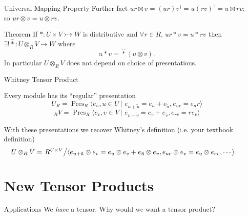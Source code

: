 \documentclass{beamer}
\renewcommand{\hat}[1]{\widehat{#1}}
\DeclareMathOperator{\Pres}{Pres}
\newcommand{\bmto}{\rightarrowtail}
\begin{document}
\begin{frame}{Universal Mapping Property}
    Further fact $ur\boxtimes v=(ur)v^{\dagger}=u(rv)^{\dagger}=u\boxtimes rv$;\\
    so $ur\otimes v=u\otimes r v$.
    
    \begin{block}{Theorem}
        If $*:U\times V\bmto W$ is distributive and $\forall r\in R$, $ur*v=u*rv$ then $\exists ! \hat{*}:U\otimes_R V\to W$ where 
        \[
            u*v = \hat{*}(u\otimes v).
        \]
        In particular $U\otimes_R V$ does not depend on choice of presentations.
    \end{block}

    
\end{frame}

\begin{frame}{Whitney Tensor Product}

    Every module has its ``regular'' presentation
    \[ U_R=\Pres_R\langle e_u, u\in U \mid e_{u+\tilde{u}}=e_u+e_{\tilde{u}}, e_{ur}=e_u r\rangle
        \]
    \[ {_R V}=\Pres_R\langle e_v, v\in V\mid e_{v+\tilde{v}}=e_v+e_{\tilde{v}}, e_{rv}=re_v\rangle
        \]

    With these presentations we recover Whitney's definition (i.e. your textbook definition)
    \begin{align*}
        U\otimes_R V & = 
        \left.
        R^{U\times V}\middle/
        \left\langle e_{u+\tilde{u}}\otimes e_v=e_u\otimes e_v+e_{\tilde{u}}\otimes e_v, e_{ur}\otimes e_v=e_u\otimes e_{rv}, \cdots \right\rangle
        \right.
    \end{align*}
\end{frame}
\section{New Tensor Products}

\begin{frame}
    
    \begin{block}{Applications}
        We \emph{have} a tensor.  Why would we want a tensor product?
    \end{block}

\end{frame}
\end{document}
